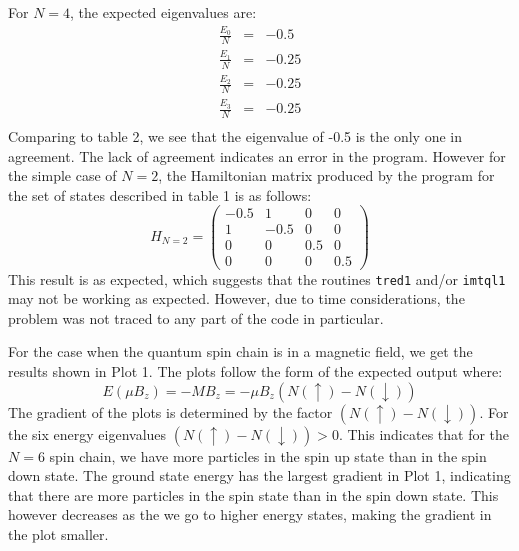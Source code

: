 \documentclass[a4paper]{IEEEtran}
\newcommand{\showcode}[1]{\begin{mdframed}[style=code] %
                          \end{mdframed}%
}
\begin{document}
    For $N=4$, the expected eigenvalues are:
    \begin{eqnarray*}
        \frac{E_0}{N} & = & -0.5  \\
        \frac{E_1}{N} & = & -0.25 \\
        \frac{E_2}{N} & = & -0.25 \\
        \frac{E_3}{N} & = & -0.25 \\
    \end{eqnarray*}
    Comparing to table 2, we see that the eigenvalue of -0.5 is the only one in agreement.
    The lack of agreement indicates an error in the program. However for the simple
    case of $N = 2$, the Hamiltonian matrix produced by the program for the 
    set of states described in table 1 is as follows:
    \[ H_{N=2} = \left( \begin{array}{rrrr}
    -0.5  &1  & 0  & 0 \\
    1  &-0.5  & 0  & 0 \\
    0  & 0  & 0.5  & 0 \\
    0  & 0  & 0  & 0.5 
    \end{array} \right) \]
    This result is as expected, which suggests that the routines \texttt{tred1}
    and/or \texttt{imtql1} may not be working as expected. However, due to 
    time considerations, the problem was not traced to any part of the code
    in particular.

    For the case when the quantum spin chain is in a magnetic field, we get
    the results shown in Plot 1. The plots follow the form of the expected
    output where:
        \[ E(\mu B_z) = -MB_z = -\mu B_z ( N(\uparrow) - N(\downarrow) ) \]
    The gradient of the plots is determined by the factor $( N(\uparrow) - N(\downarrow) ) $.
    For the six energy eigenvalues $( N(\uparrow) - N(\downarrow) ) > 0$. This indicates
    that for the $N=6$ spin chain, we have more particles in the spin up
    state than in the spin down state. The ground state energy has the largest
    gradient in Plot 1, indicating that there are more particles in the spin state
    than in the spin down state. This however decreases as the we go to higher
    energy states, making the gradient in the plot smaller.


\onecolumn

\showcode{spin.f} 
\end{document}
